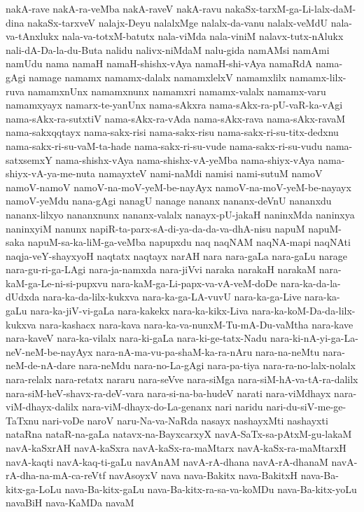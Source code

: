 {nakA-rave
nakA-ra-veMba
nakA-raveV
nakA-ravu
nakaSx-tarxM-ga-Li-lalx-daM-dina
nakaSx-tarxveV
nalajx-Deyu
nalalxMge
nalalx-da-vanu
nalalx-veMdU
nala-va-tAnxlukx
nala-va-totxM-batutx
nala-viMda
nala-viniM
nalavx-tutx-nAlukx
nali-dA-Da-la-du-Buta
nalidu
nalivx-niMdaM
nalu-gida
namAMsi
namAmi
namUdu
nama
namaH
namaH-shishx-vAya
namaH-shi-vAya
namaRdA
nama-gAgi
namage
namamx
namamx-dalalx
namamxlelxV
namamxlilx
namamx-lilx-ruva
namamxnUnx
namamxnunx
namamxri
namamx-valalx
namamx-varu
namamxyayx
namarx-te-yanUnx
nama-sAkxra
nama-sAkx-ra-pU-vaR-ka-vAgi
nama-sAkx-ra-sutxtiV
nama-sAkx-ra-vAda
nama-sAkx-rava
nama-sAkx-ravaM
nama-sakxqqtayx
nama-sakx-risi
nama-sakx-risu
nama-sakx-ri-su-titx-dedxnu
nama-sakx-ri-su-vaM-ta-hade
nama-sakx-ri-su-vude
nama-sakx-ri-su-vudu
nama-satxsemxY
nama-shishx-vAya
nama-shishx-vA-yeMba
nama-shiyx-vAya
nama-shiyx-vA-ya-me-nuta
namayxteV
nami-naMdi
namisi
nami-sutuM
namoV
namoV-namoV
namoV-na-moV-yeM-be-nayAyx
namoV-na-moV-yeM-be-nayayx
namoV-yeMdu
nana-gAgi
nanagU
nanage
nananx
nananx-deVnU
nananxdu
nananx-lilxyo
nananxnunx
nananx-valalx
nanayx-pU-jakaH
naninxMda
naninxya
naninxyiM
nanunx
napiR-ta-parx-sA-di-ya-da-da-va-dhA-nisu
napuM
napuM-saka
napuM-sa-ka-liM-ga-veMba
napupxdu
naq
naqNAM
naqNA-mapi
naqNAti
naqja-veY-shayxyoH
naqtatx
naqtayx
narAH
nara
nara-gaLa
nara-gaLu
narage
nara-gu-ri-ga-LAgi
nara-ja-namxda
nara-jiVvi
naraka
narakaH
narakaM
nara-kaM-ga-Le-ni-si-pupxvu
nara-kaM-ga-Li-papx-va-vA-veM-doDe
nara-ka-da-la-dUdxda
nara-ka-da-lilx-kukxva
nara-ka-ga-LA-vuvU
nara-ka-ga-Live
nara-ka-gaLu
nara-ka-jiV-vi-gaLa
nara-kakekx
nara-ka-kikx-Liva
nara-ka-koM-Da-da-lilx-kukxva
nara-kashacx
nara-kava
nara-ka-va-nunxM-Tu-mA-Du-vaMtha
nara-kave
nara-kaveV
nara-ka-vilalx
nara-ki-gaLa
nara-ki-ge-tatx-Nadu
nara-ki-nA-yi-ga-La-neV-neM-be-nayAyx
nara-nA-ma-vu-pa-shaM-ka-ra-nAru
nara-na-neMtu
nara-neM-de-nA-dare
nara-neMdu
nara-no-La-gAgi
nara-pa-tiya
nara-ra-no-lalx-nolalx
nara-relalx
nara-retatx
nararu
nara-seVve
nara-siMga
nara-siM-hA-va-tA-ra-dalilx
nara-siM-heV-shavx-ra-deV-vara
nara-si-na-ba-hudeV
narati
nara-viMdhayx
nara-viM-dhayx-dalilx
nara-viM-dhayx-do-La-genanx
nari
naridu
nari-du-siV-me-ge-TaTxnu
nari-voDe
naroV
naru-Na-va-NaRda
nasayx
nashayxMti
nashayxti
nataRna
nataR-na-gaLa
natavx-na-BayxcarxyX
navA-SaTx-sa-pAtxM-gu-lakaM
navA-kaSxrAH
navA-kaSxra
navA-kaSx-ra-maMtarx
navA-kaSx-ra-maMtarxH
navA-kaqti
navA-kaq-ti-gaLu
navAnAM
navA-rA-dhana
navA-rA-dhanaM
navA-rA-dha-na-mA-ca-reVtf
navAsoyxV
nava
nava-Bakitx
nava-BakitxH
nava-Ba-kitx-ga-LoLu
nava-Ba-kitx-gaLu
nava-Ba-kitx-ra-sa-va-koMDu
nava-Ba-kitx-yoLu
navaBiH
nava-KaMDa
navaM
}
